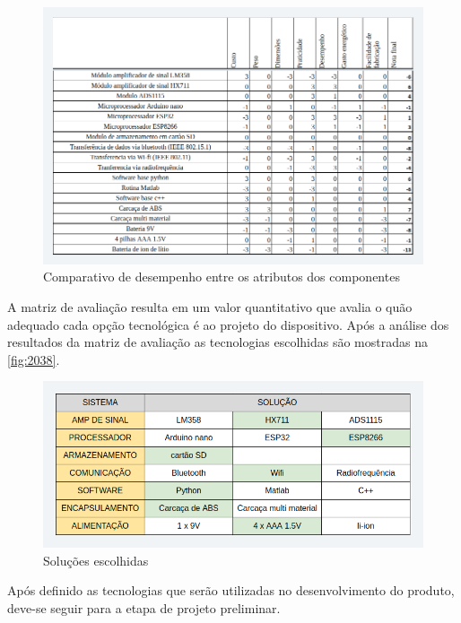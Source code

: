 \begin{figure}[H]
	\caption{\label{fig:2037} Comparativo de desempenho entre os atributos dos componentes}
	\begin{center}
		\includegraphics[width=600, angle=90]{pictures/2037.png}
	\end{center}
\end{figure}

A matriz de avaliação resulta em um valor quantitativo que avalia o quão adequado cada opção tecnológica é ao projeto do dispositivo.
Após a análise dos resultados da matriz de avaliação as tecnologias escolhidas são mostradas na \autoref{fig:2038}.

\begin{figure}[H]
	\caption{\label{fig:2038} Soluções escolhidas}
	\begin{center}
		\includegraphics[width=\textwidth]{pictures/2038.png}
	\end{center}
\end{figure}

Após definido as tecnologias que serão utilizadas no desenvolvimento do produto, deve-se seguir para a etapa de projeto preliminar.

